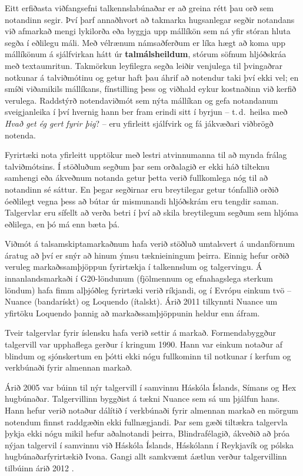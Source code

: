 \documentclass{../../metanetpaper}
\begin{document}
\begin{multicols}{2}
Eitt erfiðasta viðfangsefni talkennslabúnaðar er að greina rétt þau orð sem notandinn segir. Því þarf annaðhvort að takmarka hugsanlegar segðir notandans við afmarkað mengi lykilorða eða byggja upp mállíkön sem ná yfir stóran hluta segða í eðlilegu máli. Með vélrænum námsaðferðum er líka hægt að koma upp mállíkönum á sjálfvirkan hátt úr \textbf{talmálsheildum}, stórum söfnum hljóðskráa með textaumritun. Takmörkun leyfilegra segða leiðir venjulega til þvingaðrar notkunar á talviðmótinu og getur haft þau áhrif að notendur taki því ekki vel; en smíði viðamikils mállíkans, fínstilling þess og viðhald eykur kostnaðinn við kerfið verulega. Raddstýrð notendaviðmót sem nýta mállíkan og gefa notandanum sveigjanleika í því hvernig hann ber fram erindi sitt í byrjun -- t.\,d.~heilsa með \textit{Hvað get ég gert fyrir þig}? -- eru yfirleitt sjálfvirk og fá jákvæðari viðbrögð notenda.

Fyrirtæki nota yfirleitt upptökur með lestri atvinnumanna til að mynda frálag talviðmótsins. Í stöðluðum segðum þar sem orðalagið er ekki háð tilteknu samhengi eða ákveðnum notanda getur þetta verið fullkomlega nóg til að notandinn sé sáttur. En þegar segðirnar eru breytilegar getur tónfallið orðið óeðlilegt vegna þess að bútar úr mismunandi hljóðskrám eru tengdir saman. Talgervlar eru sífellt að verða betri í því að skila breytilegum segðum sem hljóma eðlilega, en þó má enn bæta þá.

Viðmót á talsamskiptamarkaðnum hafa verið stöðluð umtalsvert á undanförnum áratug að því er snýr að hinum ýmsu tæknieiningum þeirra. Einnig hefur orðið veruleg markaðssamþjöppun fyrirtækja í talkennslum og talgervingu. Á innanlandsmarkaði í G20-löndunum (fjölmennum og efnahagslega sterkum löndum) hafa fimm alþjóðleg fyrirtæki verið ríkjandi, og í Evrópu einkum tvö -- Nuance (bandarískt) og Loquendo (ítalskt). Árið 2011 tilkynnti Nuance um yfirtöku Loquendo þannig að markaðssamþjöppunin heldur enn áfram.

Tveir talgervlar fyrir íslensku hafa verið settir á markað. Formendabyggður talgervill var upphaflega gerður í kringum 1990. Hann var einkum notaður af blindum og sjónskertum en þótti ekki nógu fullkominn til notkunar í kerfum og verkbúnaði fyrir almennan markað. 

Árið 2005 var búinn til nýr talgervill í samvinnu Háskóla Íslands, Símans og Hex hugbúnaðar. Talgervillinn byggðist á tækni Nuance sem sá um þjálfun hans. Hann hefur verið notaður dálítið í verkbúnaði fyrir almennan markað en mörgum notendum finnst raddgæðin ekki fullnægjandi. Þar sem gæði tiltækra talgervla þykja ekki nógu mikil hefur aðalnotandi þeirra, Blindrafélagið, ákveðið að þróa nýjan talgervil í samvinnu við Háskóla Íslands, Háskólann í Reykjavík og pólska hugbúnaðarfyrirtækið Ivona. Gangi allt samkvæmt áætlun verður talgervillinn tilbúinn árið 2012 \cite{tal1}.


\end{multicols}
\end{document}
